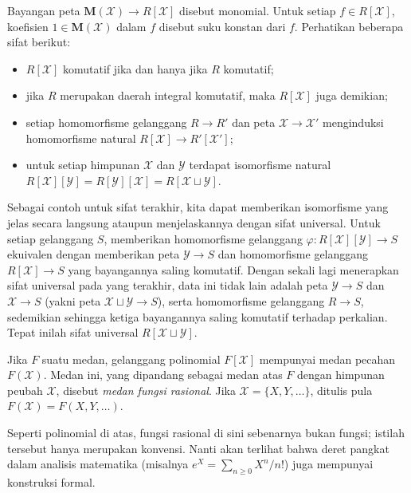 Bayangan peta $\mathbf{M}(\mathcal{X}) \to R[\mathcal{X}]$ disebut monomial. Untuk setiap $f \in R[\mathcal{X}]$, koefisien $1 \in \mathbf{M}(\mathcal{X})$ dalam $f$ disebut suku konstan dari $f$. Perhatikan beberapa sifat berikut:
\begin{itemize}
	\item $R[\mathcal{X}]$ komutatif jika dan hanya jika $R$ komutatif;
	\item jika $R$ merupakan daerah integral komutatif, maka $R[\mathcal{X}]$ juga demikian;
	\item setiap homomorfisme gelanggang $R \to R'$ dan peta $\mathcal{X} \to \mathcal{X}'$ menginduksi homomorfisme natural $R[\mathcal{X}] \to R'[\mathcal{X}']$;
	\item untuk setiap himpunan $\mathcal{X}$ dan $\mathcal{Y}$ terdapat isomorfisme natural $R[\mathcal{X}][\mathcal{Y}] = R[\mathcal{Y}][\mathcal{X}] = R[\mathcal{X} \sqcup \mathcal{Y}]$.
\end{itemize}
Sebagai contoh untuk sifat terakhir, kita dapat memberikan isomorfisme yang jelas secara langsung ataupun menjelaskannya dengan sifat universal. Untuk setiap gelanggang $S$, memberikan homomorfisme gelanggang $\varphi: R[\mathcal{X}][\mathcal{Y}] \to S$ ekuivalen dengan memberikan peta $\mathcal{Y} \to S$ dan homomorfisme gelanggang $R[\mathcal{X}] \to S$ yang bayangannya saling komutatif. Dengan sekali lagi menerapkan sifat universal pada yang terakhir, data ini tidak lain adalah peta $\mathcal{Y} \to S$ dan $\mathcal{X} \to S$ (yakni peta $\mathcal{X} \sqcup \mathcal{Y} \to S$), serta homomorfisme gelanggang $R \to S$, sedemikian sehingga ketiga bayangannya saling komutatif terhadap perkalian. Tepat inilah sifat universal $R[\mathcal{X} \sqcup \mathcal{Y}]$.

\begin{definition}
	Jika $F$ suatu medan, gelanggang polinomial $F[\mathcal{X}]$ mempunyai medan pecahan $F(\mathcal{X})$. Medan ini, yang dipandang sebagai medan atas $F$ dengan himpunan peubah $\mathcal{X}$, disebut \emph{medan fungsi rasional}. Jika $\mathcal{X} = \{X, Y, \ldots\}$, ditulis pula $F(\mathcal{X}) = F(X, Y, \ldots)$.
\end{definition}
Seperti polinomial di atas, fungsi rasional di sini sebenarnya bukan fungsi; istilah tersebut hanya merupakan konvensi. Nanti akan terlihat bahwa deret pangkat dalam analisis matematika (misalnya $e^X = \sum_{n \geq 0} X^n/n!$) juga mempunyai konstruksi formal.

